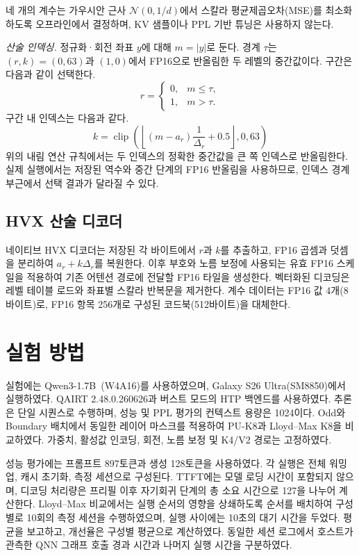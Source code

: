 \documentclass[conference,a4paper,10pt]{IEEEtran}
\newcommand{\clip}{\operatorname{clip}}
\begin{document}
네 개의 계수는 가우시안 근사 $\mathcal{N}(0,1/d)$에서 스칼라 평균제곱오차(MSE)를 최소화하도록 오프라인에서 결정하며, KV 샘플이나 PPL 기반 튜닝은 사용하지 않는다.

\emph{산술 인덱싱.} 정규화·회전 좌표 $y$에 대해 $m=|y|$로 둔다. 경계 $\tau$는 $(r,k)=(0,63)$과 $(1,0)$에서 FP16으로 반올림한 두 레벨의 중간값이다. 구간은 다음과 같이 선택한다.
\begin{equation}
 \boxed{r=\begin{cases}
  0,&m\leq\tau,\\
  1,&m>\tau.
 \end{cases}}
 \label{eq:region}
\end{equation}
구간 내 인덱스는 다음과 같다.
\begin{equation}
 \boxed{k=\clip\!\left(\left\lfloor(m-a_r)\dfrac{1}{\Delta_r}+0.5\right\rfloor,0,63\right)}
 \label{eq:index}
\end{equation}
위의 내림 연산 규칙에서는 두 인덱스의 정확한 중간값을 큰 쪽 인덱스로 반올림한다. 실제 실행에서는 저장된 역수와 중간 단계의 FP16 반올림을 사용하므로, 인덱스 경계 부근에서 선택 결과가 달라질 수 있다.

\subsection{HVX 산술 디코더}
네이티브 HVX 디코더는 저장된 각 바이트에서 $r$과 $k$를 추출하고, FP16 곱셈과 덧셈을 분리하여 $a_r+k\Delta_r$를 복원한다. 이후 부호와 노름 보정에 사용되는 유효 FP16 스케일을 적용하여 기존 어텐션 경로에 전달할 FP16 타일을 생성한다. 벡터화된 디코딩은 레벨 테이블 로드와 좌표별 스칼라 반복문을 제거한다. 계수 데이터는 FP16 값 4개(8바이트)로, FP16 항목 256개로 구성된 코드북(512바이트)을 대체한다.

\section{실험 방법}
실험에는 Qwen3-1.7B~\cite{qwen3}(W4A16)를 사용하였으며, Galaxy S26 Ultra(SM8850)에서 실행하였다. QAIRT 2.48.0.260626과 버스트 모드의 HTP 백엔드를 사용하였다. 추론은 단일 시퀀스로 수행하며, 성능 및 PPL 평가의 컨텍스트 용량은 1024이다. Odd와 Boundary 배치에서 동일한 레이어 마스크를 적용하여 PU-K8과 Lloyd--Max K8을 비교하였다. 가중치, 활성값 인코딩, 회전, 노름 보정 및 K4/V2 경로는 고정하였다.

성능 평가에는 프롬프트 897토큰과 생성 128토큰을 사용하였다. 각 실행은 전체 워밍업, 캐시 초기화, 측정 세션으로 구성된다. TTFT에는 모델 로딩 시간이 포함되지 않으며, 디코딩 처리량은 프리필 이후 자기회귀 단계의 총 소요 시간으로 127을 나누어 계산한다. Lloyd--Max 비교에서는 실행 순서의 영향을 상쇄하도록 순서를 배치하여 구성별로 10회의 측정 세션을 수행하였으며, 실행 사이에는 10초의 대기 시간을 두었다. 평균을 보고하고, 개선율은 구성별 평균으로 계산하였다. 동일한 세션 로그에서 호스트가 관측한 QNN 그래프 호출 경과 시간과 나머지 실행 시간을 구분하였다.
\end{document}
